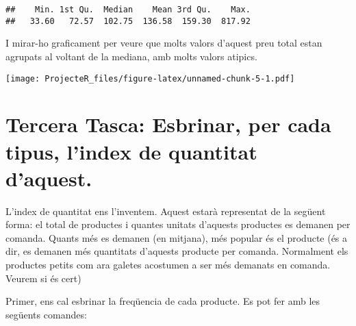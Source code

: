\documentclass[
]{article}
\newenvironment{Shaded}{\begin{snugshade}}{\end{snugshade}}
\newcommand{\AttributeTok}[1]{\textcolor[rgb]{0.77,0.63,0.00}{#1}}
\newcommand{\DecValTok}[1]{\textcolor[rgb]{0.00,0.00,0.81}{#1}}
\newcommand{\FunctionTok}[1]{\textcolor[rgb]{0.00,0.00,0.00}{#1}}
\newcommand{\NormalTok}[1]{#1}
\newcommand{\OtherTok}[1]{\textcolor[rgb]{0.56,0.35,0.01}{#1}}
\newcommand{\SpecialCharTok}[1]{\textcolor[rgb]{0.00,0.00,0.00}{#1}}
\begin{document}
\begin{Shaded}
\end{Shaded}

\begin{verbatim}
##    Min. 1st Qu.  Median    Mean 3rd Qu.    Max. 
##   33.60   72.57  102.75  136.58  159.30  817.92
\end{verbatim}

I mirar-ho graficament per veure que molts valors d'aquest preu total
estan agrupats al voltant de la mediana, amb molts valors atipics.

\begin{Shaded}
\end{Shaded}

\texttt{[image: ProjecteR\_files/figure-latex/unnamed-chunk-5-1.pdf]}

\hypertarget{tercera-tasca-esbrinar-per-cada-tipus-lindex-de-quantitat-daquest.}{%
\section{Tercera Tasca: Esbrinar, per cada tipus, l'index de quantitat
d'aquest.}\label{tercera-tasca-esbrinar-per-cada-tipus-lindex-de-quantitat-daquest.}}

L'index de quantitat ens l'inventem. Aquest estarà representat de la
següent forma: el total de productes i quantes unitats d'aquests
productes es demanen per comanda. Quants més es demanen (en mitjana),
més popular és el producte (és a dir, es demanen més quantitats
d'aquests producte per comanda. Normalment els productes petits com ara
galetes acostumen a ser més demanats en comanda. Veurem si és cert)

Primer, ens cal esbrinar la freqüencia de cada producte. Es pot fer amb
les següents comandes:

\begin{Shaded}
\end{Shaded}
\end{document}
